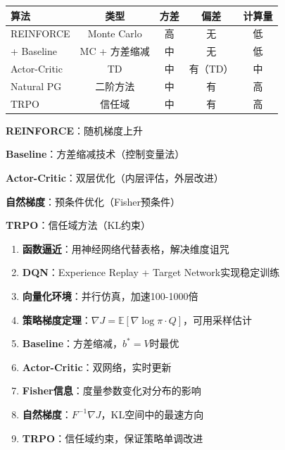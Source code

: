 \documentclass[11pt,a4paper]{article}
\theoremstyle{definition}
\begin{document}
\begin{center}
\begin{tabular}{l|c|c|c|c}
\toprule
\textbf{算法} & \textbf{类型} & \textbf{方差} & \textbf{偏差} & \textbf{计算量} \\
\midrule
REINFORCE & Monte Carlo & 高 & 无 & 低 \\
+ Baseline & MC + 方差缩减 & 中 & 无 & 低 \\
Actor-Critic & TD & 中 & 有（TD） & 中 \\
Natural PG & 二阶方法 & 中 & 有 & 高 \\
TRPO & 信任域 & 中 & 有 & 高 \\
\bottomrule
\end{tabular}
\end{center}

\begin{keypoint}[优化视角的统一]
\textbf{REINFORCE}：随机梯度上升

\textbf{Baseline}：方差缩减技术（控制变量法）

\textbf{Actor-Critic}：双层优化（内层评估，外层改进）

\textbf{自然梯度}：预条件优化（Fisher预条件）

\textbf{TRPO}：信任域方法（KL约束）
\end{keypoint}

\begin{magicbox}[本讲核心信息]
\begin{enumerate}
    \item \textbf{函数逼近}：用神经网络代替表格，解决维度诅咒
    \item \textbf{DQN}：Experience Replay + Target Network实现稳定训练
    \item \textbf{向量化环境}：并行仿真，加速100-1000倍
    \item \textbf{策略梯度定理}：$\nabla J = \mathbb{E}[\nabla \log \pi \cdot Q]$，可用采样估计
    \item \textbf{Baseline}：方差缩减，$b^* = V$时最优
    \item \textbf{Actor-Critic}：双网络，实时更新
    \item \textbf{Fisher信息}：度量参数变化对分布的影响
    \item \textbf{自然梯度}：$F^{-1} \nabla J$，KL空间中的最速方向
    \item \textbf{TRPO}：信任域约束，保证策略单调改进
\end{enumerate}
\end{magicbox}

\end{document}
